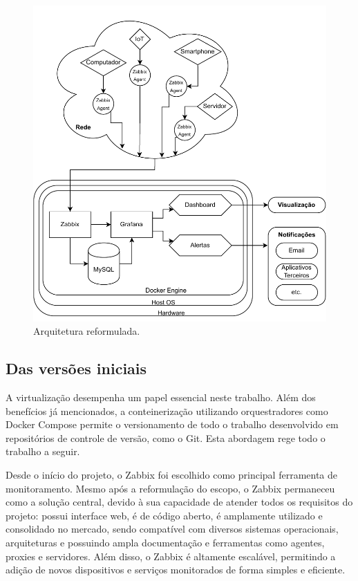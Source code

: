 \begin{figure}[H]
\centering
\includegraphics[scale=0.97]{Imagens/chap03/v2_diagram.pdf}
\caption{Arquitetura reformulada.}
\label{fig:ArquiteturaReformulada}
\end{figure}


\subsection{Das versões iniciais}
\label{subsection:VersõesIniciais}

A virtualização desempenha um papel essencial neste trabalho. Além dos benefícios já mencionados, a conteinerização utilizando orquestradores como Docker Compose permite o versionamento de todo o trabalho desenvolvido em repositórios de controle de versão, como o Git. Esta abordagem rege todo o trabalho a seguir.

Desde o início do projeto, o Zabbix foi escolhido como principal ferramenta de monitoramento. Mesmo após a reformulação do escopo, o Zabbix permaneceu como a solução central, devido à sua capacidade de atender todos os requisitos do projeto: possui interface web, é de código aberto, é amplamente utilizado e consolidado no mercado, sendo compatível com diversos sistemas operacionais, arquiteturas e possuindo ampla documentação e ferramentas como agentes, proxies e servidores. Além disso, o Zabbix é altamente escalável, permitindo a adição de novos dispositivos e serviços monitorados de forma simples e eficiente.

